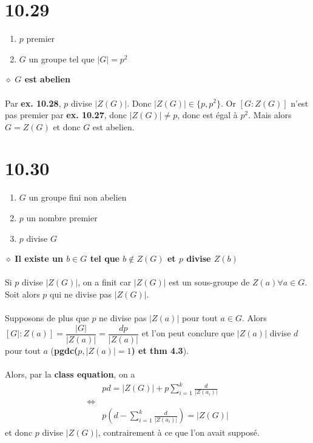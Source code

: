 \documentclass[a4paper,10pt]{article}
\begin{document}
\section*{10.29}
\begin{enumerate}
 \item $p$ premier
 \item $G$ un groupe tel que $|G| = p^2$
\end{enumerate}
$\diamond$ \textbf{$G$ est abelien}
\\
\\
Par \textbf{ex. 10.28}, $p$ divise $|Z(G)|$. Donc $|Z(G)| \in \{p,p^2\}$. Or $[G:Z(G)]$ n'est pas premier par \textbf{ex. 10.27},
donc $|Z(G)| \not = p$, donc est égal à $p^2$. Mais alors $G = Z(G)$ et donc $G$ est abelien.

\section*{10.30}
\begin{enumerate}
 \item $G$ un groupe fini non abelien
 \item $p$ un nombre premier
 \item $p$ divise $G$
\end{enumerate}
$\diamond$ \textbf{Il existe un $b \in G$ tel que $b \not \in Z(G)$ et $p$ divise $Z(b)$}
\\
\\
Si $p$ divise $|Z(G)|$, on a finit car $|Z(G)|$ est un sous-groupe de $Z(a) \forall a \in G$. Soit alors $p$ qui ne divise pas $|Z(G)|$. 
\\
\\
Supposons de plus que $p$ ne divise pas $|Z(a)|$ pour tout $a \in G$. Alors $[G|:Z(a)] = \dfrac{|G|}{|Z(a)|} = \dfrac{dp}{|Z(a)|}$ et 
l'on peut conclure que $|Z(a)|$ divise $d$ pour tout $a$ (\textbf{pgdc($p,|Z(a)|=1$) et thm 4.3}).
\\
\\
Alors, par la \textbf{class equation}, on a
\begin{align*}
 & pd = |Z(G)| + p\sum_{i=1}^k \frac{d}{|Z(a_i)|} \\
 \Leftrightarrow \\
 & p(d - \sum_{i=1}^k \frac{d}{|Z(a_i)|}) = |Z(G)|
\end{align*}
et donc $p$ divise $|Z(G)|$, contrairement à ce que l'on avait supposé.
\end{document}
